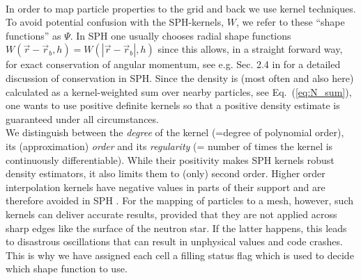 \documentclass[useAMS,usenatbib]{iopart}
\begin{document}
\\
In order to map particle properties to the grid and back we use kernel techniques.  
To avoid potential confusion with the SPH-kernels, $W$, we refer to these ``shape functions'' as $\Psi$.
In SPH one usually chooses radial shape functions $W(\vec{r}-\vec{r}_b,h)= W(|\vec{r}-\vec{r}_b|,h)$ since this
allows, in a straight forward way, for exact conservation of angular momentum, see e.g. Sec. 2.4 in \cite{rosswog09b}
for a detailed discussion of conservation in SPH. Since the density is (most often and also here) calculated
as a kernel-weighted sum over nearby particles, see Eq.~(\ref{eq:N_sum}), one wants to use positive definite
kernels so that a positive density estimate is guaranteed under all circumstances.\\
We distinguish between the {\em degree} of the kernel (=degree of polynomial order), its (approximation) {\em order}
and its {\em regularity} (= number of times the kernel is continuously differentiable). 
While their positivity makes SPH kernels robust density estimators, it also limits them  
to (only) second order. Higher order interpolation  kernels have negative values
in parts of their support  and are therefore avoided in SPH \cite{monaghan92}. For the mapping
of particles to a mesh, however, such kernels can deliver accurate results, provided that they are not 
applied across sharp edges like the surface of the neutron star. If the latter happens, this leads to
disastrous oscillations that can result in unphysical values and code crashes. This is why 
we have assigned each cell a filling status flag which is used to decide which shape function to use.\\

\\
\end{document}
